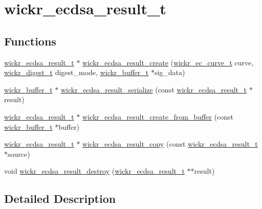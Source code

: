 \hypertarget{group__wickr__ecdsa__result}{}\section{wickr\+\_\+ecdsa\+\_\+result\+\_\+t}
\label{group__wickr__ecdsa__result}
\subsection*{Functions}
\begin{DoxyCompactItemize}
\item 
\hyperlink{structwickr__ecdsa__result}{wickr\+\_\+ecdsa\+\_\+result\+\_\+t} $\ast$ \hyperlink{group__wickr__ecdsa__result_ga7e199a7c851fd07fb93180fb3a242749}{wickr\+\_\+ecdsa\+\_\+result\+\_\+create} (\hyperlink{structwickr__ec__curve}{wickr\+\_\+ec\+\_\+curve\+\_\+t} curve, \hyperlink{structwickr__digest}{wickr\+\_\+digest\+\_\+t} digest\+\_\+mode, \hyperlink{structwickr__buffer}{wickr\+\_\+buffer\+\_\+t} $\ast$sig\+\_\+data)
\item 
\hyperlink{structwickr__buffer}{wickr\+\_\+buffer\+\_\+t} $\ast$ \hyperlink{group__wickr__ecdsa__result_ga417d1186e93d6ae4ee4cf701a2bfb1b2}{wickr\+\_\+ecdsa\+\_\+result\+\_\+serialize} (const \hyperlink{structwickr__ecdsa__result}{wickr\+\_\+ecdsa\+\_\+result\+\_\+t} $\ast$result)
\item 
\hyperlink{structwickr__ecdsa__result}{wickr\+\_\+ecdsa\+\_\+result\+\_\+t} $\ast$ \hyperlink{group__wickr__ecdsa__result_gaa3a5ba5ce3df076cf5a9984f68e34c3a}{wickr\+\_\+ecdsa\+\_\+result\+\_\+create\+\_\+from\+\_\+buffer} (const \hyperlink{structwickr__buffer}{wickr\+\_\+buffer\+\_\+t} $\ast$buffer)
\item 
\hyperlink{structwickr__ecdsa__result}{wickr\+\_\+ecdsa\+\_\+result\+\_\+t} $\ast$ \hyperlink{group__wickr__ecdsa__result_ga8664bbdec0bc8b354b3cb35704c42f57}{wickr\+\_\+ecdsa\+\_\+result\+\_\+copy} (const \hyperlink{structwickr__ecdsa__result}{wickr\+\_\+ecdsa\+\_\+result\+\_\+t} $\ast$source)
\item 
void \hyperlink{group__wickr__ecdsa__result_ga84fb120b34b4b7ede4042009c735ea5d}{wickr\+\_\+ecdsa\+\_\+result\+\_\+destroy} (\hyperlink{structwickr__ecdsa__result}{wickr\+\_\+ecdsa\+\_\+result\+\_\+t} $\ast$$\ast$result)
\end{DoxyCompactItemize}


\subsection{Detailed Description}


